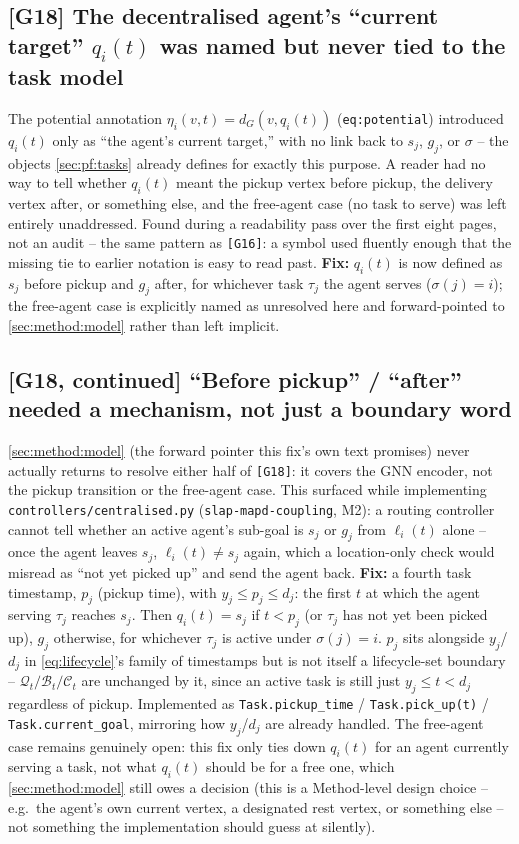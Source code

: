 \documentclass[11pt]{article}
\begin{document}
\subsection*{[G18] The decentralised agent's ``current target'' \texorpdfstring{$q_i(t)$}{q\_i(t)} was named but never tied to the task model}
The potential annotation $\eta_i(v,t) = d_G(v, q_i(t))$ (\texttt{eq:potential})
introduced $q_i(t)$ only as ``the agent's current target,'' with no link back
to $s_j$, $g_j$, or $\sigma$ -- the objects \ref{sec:pf:tasks} already defines
for exactly this purpose. A reader had no way to tell whether $q_i(t)$ meant
the pickup vertex before pickup, the delivery vertex after, or something
else, and the free-agent case (no task to serve) was left entirely
unaddressed. Found during a readability pass over the first eight pages, not
an audit -- the same pattern as \texttt{[G16]}: a symbol used fluently enough
that the missing tie to earlier notation is easy to read past. \textbf{Fix:}
$q_i(t)$ is now defined as $s_j$ before pickup and $g_j$ after, for whichever
task $\tau_j$ the agent serves ($\sigma(j)=i$); the free-agent case is
explicitly named as unresolved here and forward-pointed to
\ref{sec:method:model} rather than left implicit.

\subsection*{[G18, continued] ``Before pickup'' / ``after'' needed a mechanism, not just a boundary word}
\ref{sec:method:model} (the forward pointer this fix's own text promises)
never actually returns to resolve either half of \texttt{[G18]}: it covers
the GNN encoder, not the pickup transition or the free-agent case. This
surfaced while implementing \texttt{controllers/centralised.py}
(\texttt{slap-mapd-coupling}, M2): a routing controller cannot tell whether
an active agent's sub-goal is $s_j$ or $g_j$ from $\ell_i(t)$ alone -- once
the agent leaves $s_j$, $\ell_i(t) \ne s_j$ again, which a location-only
check would misread as ``not yet picked up'' and send the agent back.
\textbf{Fix:} a fourth task timestamp, $p_j$ (pickup time), with
$y_j \le p_j \le d_j$: the first $t$ at which the agent serving $\tau_j$
reaches $s_j$. Then $q_i(t) = s_j$ if $t < p_j$ (or $\tau_j$ has not yet been
picked up), $g_j$ otherwise, for whichever $\tau_j$ is active under
$\sigma(j)=i$. $p_j$ sits alongside $y_j$/$d_j$ in \eqref{eq:lifecycle}'s
family of timestamps but is not itself a lifecycle-set boundary --
$\mathcal{Q}_t/\mathcal{B}_t/\mathcal{C}_t$ are unchanged by it, since an
active task is still just $y_j \le t < d_j$ regardless of pickup. Implemented
as \texttt{Task.pickup\_time} / \texttt{Task.pick\_up(t)} /
\texttt{Task.current\_goal}, mirroring how $y_j$/$d_j$ are already handled.
The free-agent case remains genuinely open: this fix only ties down $q_i(t)$
for an agent currently serving a task, not what $q_i(t)$ should be for a
free one, which \ref{sec:method:model} still owes a decision (this is a
Method-level design choice -- e.g.\ the agent's own current vertex, a
designated rest vertex, or something else -- not something the
implementation should guess at silently).
\end{document}
